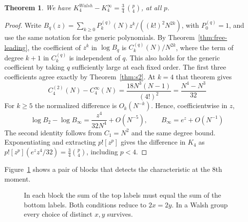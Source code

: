 \documentclass[11pt,a4paper]{article}
\newtheorem{thm}{Theorem}[section]
\theoremstyle{remark}
\begin{document}
\begin{samepage}
\begin{thm}\label{thm:k4}
We have $K_4^{Walsh}-K_4^\infty=\frac{3}{4}\,\binom{p}{4}$, at all $p$.
\end{thm}
\end{samepage}

\begin{proof}
Write $B_q(z)=\sum_{k\ge0}P_k^{(q)}(N)z^k/((k!)^2N^{2k})$, with $P_0^{(q)}=1$, and use the same notation for the generic polynomials. By Theorem~\ref{thm:free-leading}, the coefficient of $z^k$ in $\log B_q$ is $C_k^{(q)}(N)/N^{2k}$, where the term of degree $k+1$ in $C_k^{(q)}$ is independent of $q$. This also holds for the generic coefficient by taking $q$ sufficiently large at each fixed order. The first three coefficients agree exactly by Theorem~\ref{thm:s2}. At $k=4$ that theorem gives
\[
 C_4^{(2)}(N)-C_4^\infty(N)
 =\frac{18N^3(N-1)}{(4!)^2}=\frac{N^4-N^3}{32}
\]
For $k\ge5$ the normalized difference is $O_k(N^{-k})$. Hence, coefficientwise in $z$,
\[
 \log B_2-\log B_\infty=\frac{z^4}{32N^4}+O(N^{-5}),
 \qquad B_\infty=e^z+O(N^{-1})
\]
The second identity follows from $C_1=N^2$ and the same degree bound. Exponentiating and extracting $p![z^p]$ gives the difference in $K_4$ as $p![z^p](e^zz^4/32)=\tfrac34\binom p4$, including $p<4$.
\end{proof}

Figure~\ref{fig:blocks} shows a pair of blocks that detects the characteristic at the 8th moment.

\begin{figure}[htb!]
\centering
{}
\caption{In each block the sum of the top labels must equal the sum of
the bottom labels. Both conditions reduce to $2x=2y$. In a Walsh group
every choice of distinct $x,y$ survives.}\label{fig:blocks}
\end{figure}
\end{document}
